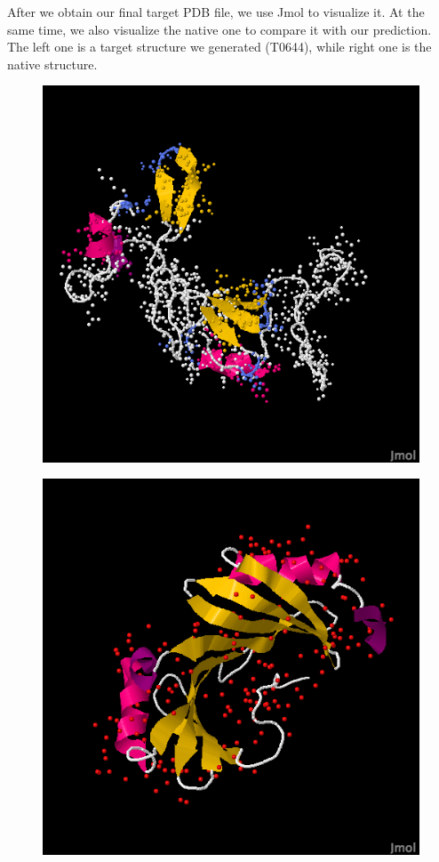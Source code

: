 \documentclass{article}
\begin{document}
After we obtain our final target PDB file, we use Jmol to visualize it. At the same time, we also visualize the native one to compare it with our prediction.  The left one is a target structure we generated (T0644), while right one is the native structure.

\begin{figure}
\centering
\begin{minipage}{.5\textwidth}
  \centering
  \includegraphics[width=.9\linewidth]{target_group_v2}
  \label{fig:test1}
\end{minipage}%
\begin{minipage}{.5\textwidth}
  \centering
  \includegraphics[width=.9\linewidth]{target_native}
  \label{fig:test2}
\end{minipage}
\end{figure}
\end{document}
